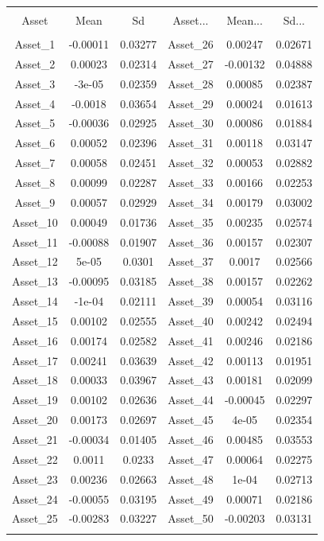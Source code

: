 \documentclass[11pt,preprint, authoryear]{elsarticle}
\let\origtable\table
\let\endorigtable\endtable
\renewenvironment{table}[1][2] {
    \expandafter\origtable\expandafter[H]
} {
    \endorigtable
}
\numberwithin{equation}{section}
\numberwithin{figure}{section}
\numberwithin{table}{section}
\begin{document}
\begin{table}[!htbp] \centering 
  \caption{Asset Means and Sd's} 
  \label{msd} 
\begin{tabular}{@{\extracolsep{5pt}} cccccc} 
\\[-1.8ex]\hline 
\hline \\[-1.8ex] 
Asset & Mean & Sd & Asset... & Mean... & Sd... \\ 
\hline \\[-1.8ex] 
Asset\_1 & -0.00011 & 0.03277 & Asset\_26 & 0.00247 & 0.02671 \\ 
Asset\_2 & 0.00023 & 0.02314 & Asset\_27 & -0.00132 & 0.04888 \\ 
Asset\_3 & -3e-05 & 0.02359 & Asset\_28 & 0.00085 & 0.02387 \\ 
Asset\_4 & -0.0018 & 0.03654 & Asset\_29 & 0.00024 & 0.01613 \\ 
Asset\_5 & -0.00036 & 0.02925 & Asset\_30 & 0.00086 & 0.01884 \\ 
Asset\_6 & 0.00052 & 0.02396 & Asset\_31 & 0.00118 & 0.03147 \\ 
Asset\_7 & 0.00058 & 0.02451 & Asset\_32 & 0.00053 & 0.02882 \\ 
Asset\_8 & 0.00099 & 0.02287 & Asset\_33 & 0.00166 & 0.02253 \\ 
Asset\_9 & 0.00057 & 0.02929 & Asset\_34 & 0.00179 & 0.03002 \\ 
Asset\_10 & 0.00049 & 0.01736 & Asset\_35 & 0.00235 & 0.02574 \\ 
Asset\_11 & -0.00088 & 0.01907 & Asset\_36 & 0.00157 & 0.02307 \\ 
Asset\_12 & 5e-05 & 0.0301 & Asset\_37 & 0.0017 & 0.02566 \\ 
Asset\_13 & -0.00095 & 0.03185 & Asset\_38 & 0.00157 & 0.02262 \\ 
Asset\_14 & -1e-04 & 0.02111 & Asset\_39 & 0.00054 & 0.03116 \\ 
Asset\_15 & 0.00102 & 0.02555 & Asset\_40 & 0.00242 & 0.02494 \\ 
Asset\_16 & 0.00174 & 0.02582 & Asset\_41 & 0.00246 & 0.02186 \\ 
Asset\_17 & 0.00241 & 0.03639 & Asset\_42 & 0.00113 & 0.01951 \\ 
Asset\_18 & 0.00033 & 0.03967 & Asset\_43 & 0.00181 & 0.02099 \\ 
Asset\_19 & 0.00102 & 0.02636 & Asset\_44 & -0.00045 & 0.02297 \\ 
Asset\_20 & 0.00173 & 0.02697 & Asset\_45 & 4e-05 & 0.02354 \\ 
Asset\_21 & -0.00034 & 0.01405 & Asset\_46 & 0.00485 & 0.03553 \\ 
Asset\_22 & 0.0011 & 0.0233 & Asset\_47 & 0.00064 & 0.02275 \\ 
Asset\_23 & 0.00236 & 0.02663 & Asset\_48 & 1e-04 & 0.02713 \\ 
Asset\_24 & -0.00055 & 0.03195 & Asset\_49 & 0.00071 & 0.02186 \\ 
Asset\_25 & -0.00283 & 0.03227 & Asset\_50 & -0.00203 & 0.03131 \\ 
\hline \\[-1.8ex] 
\end{tabular} 
\end{table}


\end{document}
